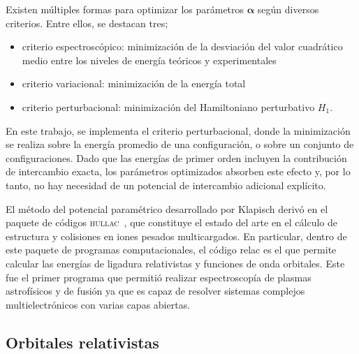 Existen múltiples formas para optimizar los parámetros 
$\boldsymbol{\alpha}$ según diversos criterios. Entre ellos, se destacan 
tres;
\begin{itemize}
\item criterio espectroscópico: minimización de la desviación del valor 
cuadrático medio entre los niveles de energía teóricos y experimentales
\item criterio variacional: minimización de la energía total
\item criterio perturbacional: minimización del Hamiltoniano perturbativo
$H_1$. 
\end{itemize}
En este trabajo, se implementa el criterio perturbacional, donde la 
minimización se realiza sobre la energía promedio de una configuración, 
o sobre un conjunto de configuraciones. Dado que las energías de primer 
orden incluyen la contribución de intercambio exacta, los parámetros 
optimizados absorben este efecto y, por lo tanto, no hay necesidad de un 
potencial de intercambio adicional explícito.

El método del potencial paramétrico desarrollado por Klapisch derivó en
el paquete de códigos \textsc{hullac}~\cite{BarShalom:01}, que constituye 
el estado del arte en el cálculo de estructura y colisiones en iones 
pesados multicargados. En particular, dentro de este paquete de 
programas computacionales, el código 
{\sc relac} es el que permite calcular las energías de ligadura 
relativistas y funciones de onda orbitales. Este fue 
el primer programa que permitió realizar espectroscopía de plasmas 
astrofísicos y de fusión ya que es capaz de resolver sistemas complejos 
multielectrónicos con varias capas abiertas. 

\subsection{Orbitales relativistas}

